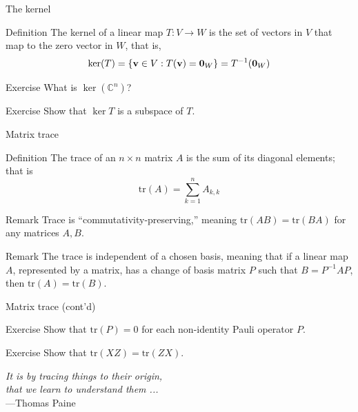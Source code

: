 \documentclass{beamer}
\newcommand{\C}{\mathbb{C}}
\newcommand{\tr}{\text{tr}}
\renewcommand{\vec}{\textbf}
\begin{document}
\begin{frame}{The kernel}
\begin{block}{Definition}
	The kernel of a linear map $T : V \to W$ is the set of vectors in $V$ that map to the zero vector in $W$, that is, $$ \ker (T) = \{ \vec v\in V: T(\vec v) = \vec0_W \} = T^{-1}(\vec 0_W) $$
\end{block}
\begin{block}{Exercise}
	What is $\ker (\C^n)$?
\end{block}
\begin{block}{Exercise}
	Show that $\ker T$ is a subspace of $T$.
\end{block}
\end{frame}

\begin{frame}{Matrix trace}

\begin{block}{Definition}
The trace of an $n \times n$ matrix $A$ is the sum of its diagonal elements; that is $$\tr(A) = \sum_{k=1}^n A_{k,k}$$
\end{block}

\begin{block}{Remark}
Trace is ``commutativity-preserving,'' meaning $\tr(AB)=\tr(BA)$ for any matrices $A,B$.
\end{block}

\begin{block}{Remark}
The trace is independent of a chosen basis, meaning that if a linear map $A$, represented by a matrix, has a change of basis matrix $P$ such that $B=P^{-1}AP$, then $\tr(A)=\tr(B)$.
\end{block}

\end{frame}

\begin{frame}{Matrix trace (cont'd)}
    \begin{block}{Exercise}
        Show that $\tr(P)=0$ for each non-identity Pauli operator $P$.
    \end{block}
    \begin{block}{Exercise}
        Show that $\tr(XZ)=\tr(ZX)$.
    \end{block}
    \begin{flushright}
    \textit{It is by tracing things to their origin,\\that we learn to understand them ...}\\---Thomas Paine
\end{flushright}
\end{frame}
\end{document}
